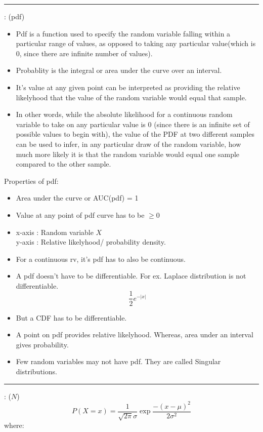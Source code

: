 \documentclass[	DIV=calc,%
paper=a4,%
fontsize=11pt,%
twocolumn]{scrartcl} %
\newcommand{\hformbar}[1]{\vspace{5pt}\hrule\vspace{10pt}} %
\newcommand{\formdesc}[1]{\noindent\textbf{#1}}
\begin{document}
\newpage
\hformbar

\formdesc{Probability Density Function} : (pdf)
\begin{itemize}
	\item Pdf is a function used to specify the random variable falling within a particular range of values, as opposed to taking any particular value(which is 0, since there are infinite number of values).
	\item Probablity is the integral or area under the curve over an interval.
	\item It's value at any given point can be interpreted as providing the relative likelyhood that the value of the random variable would equal that sample.
	\item In other words, while the absolute likelihood for a continuous random variable to take on any particular value is 0 (since there is an infinite set of possible values to begin with), the value of the PDF at two different samples can be used to infer, in any particular draw of the random variable, how much more likely it is that the random variable would equal one sample compared to the other sample. 
\end{itemize}
Properties of pdf:
\begin{itemize}
	\item Area under the curve or AUC(pdf) = 1
	\item Value at any point of pdf curve has to be $\geq0$
	\item x-axis : Random variable $X$ \\ y-axis : Relative likelyhood/ probability density.
	\item For a continuous rv, it's pdf has to also be continuous.
	\item A pdf doesn't have to be differentiable. For ex. Laplace distribution is not differentiable. $$\frac{1}{2}e^{-|x|}$$
	\item But a CDF has to be differentiable.
	\item A point on pdf provides relative likelyhood. Whereas, area under an interval gives probability.
	\item Few random variables may not have pdf. They are called Singular distributions.
\end{itemize}

\newpage
\hformbar

\formdesc{Gaussian/ Normal Distribution}: ($N$)
\begin{equation}
	P(X=x) = \frac{1}{\sqrt{2\pi}\sigma} \exp{\frac{-(x-\mu)^2}{2\sigma^2}}
\end{equation}
where:
\end{document}
